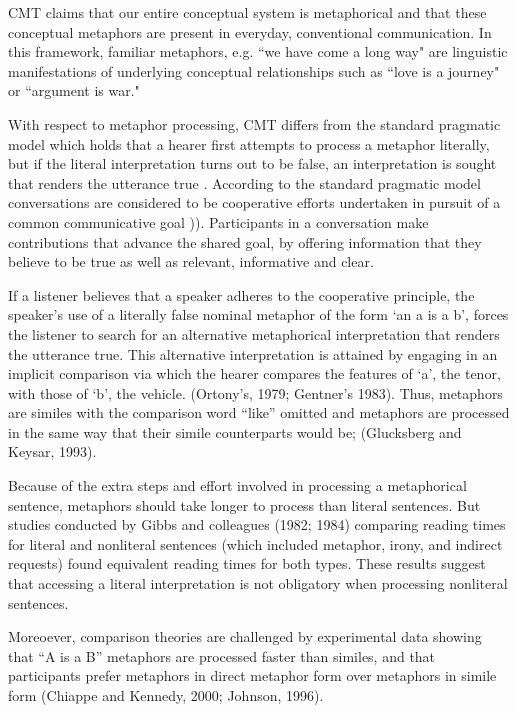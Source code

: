 \documentclass[]{article}
\begin{document}
	CMT claims that our entire conceptual system is metaphorical and that these conceptual metaphors are present in everyday, conventional communication. In this framework, familiar metaphors, e.g. ``we have come a long way" are linguistic manifestations of underlying conceptual relationships such as ``love is a journey" or ``argument is war." 
	
	With respect to metaphor processing, CMT differs from the standard pragmatic model  which holds that a hearer first attempts to process a metaphor literally, but if the literal interpretation turns out to be false, an interpretation is sought that renders the utterance true \parencite{ortony_metaphor_1979}. According to the standard pragmatic model conversations are considered to be cooperative efforts undertaken in pursuit of  a common communicative goal \parencite{})).  Participants in a conversation make contributions that advance the shared goal, by offering information that they believe to be true as well as relevant, informative and clear. 
	
	If a listener believes that a speaker adheres to the cooperative principle, the speaker's use of a literally false nominal metaphor of the form `an a is a b', forces the listener to search for an alternative metaphorical interpretation that renders the utterance true.  This alternative interpretation is attained by engaging in an implicit comparison via which the hearer compares the features of `a’, the tenor, with those of `b’, the vehicle. (Ortony’s, 1979; Gentner’s 1983). Thus, metaphors are similes with the comparison word “like” omitted and metaphors are processed in the same way that their simile counterparts would be;  (Glucksberg and Keysar, 1993).
	
	Because of the extra steps and effort involved in processing a metaphorical sentence, metaphors should take longer to process than literal sentences. But studies conducted by Gibbs and colleagues (1982; 1984) comparing reading times for literal and nonliteral sentences (which included metaphor, irony, and indirect requests) found equivalent reading times for both types. These results suggest that accessing a literal interpretation is not obligatory when processing nonliteral sentences. 
	
	Moreoever, comparison theories are challenged by experimental data showing that “A is a B” metaphors are processed faster than similes, and that participants prefer metaphors in direct metaphor form over metaphors in simile form (Chiappe and Kennedy, 2000; Johnson, 1996).
	
\end{document}
